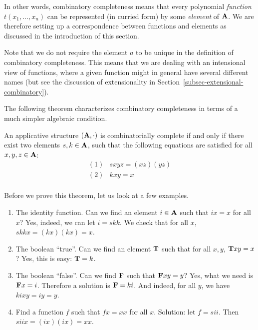 \documentclass{article}
\begin{document}
In other words, combinatory completeness means that every polynomial
{\em function} $t(x_1,\ldots,x_n)$ can be represented (in curried
form) by some {\em element} of ${\bf A}$. We are therefore setting up a
correspondence between functions and elements as discussed in the
introduction of this section.

Note that we do not require the element $a$ to be unique in the
definition of combinatory completeness. This means that we are dealing
with an intensional view of functions, where a given function might in
general have several different names (but see the discussion of
extensionality in Section~\ref{subsec-extensional-combinatory}).

The following theorem characterizes combinatory completeness in terms
of a much simpler algebraic condition.

\begin{theorem}\label{thm-combinatory-completeness}
  An applicative structure $({\bf A},\cdot)$ is combinatorially complete if
  and only if there exist two elements $s,k\in {\bf A}$, such that the
  following equations are satisfied for all $x,y,z\in{\bf A}$:
  \[ \begin{array}{ll}
    (1) & sxyz = (xz)(yz) \\
    (2) & kxy = x \\
  \end{array}
  \]
\end{theorem}

\begin{example}\label{exa-combinatory-completeness}
  Before we prove this theorem, let us look at a few examples.
  \begin{enumerate}\alphalabels
  \item The identity function. Can we find an element $i\in{\bf A}$ such
    that $ix=x$ for all $x$? Yes, indeed, we can let $i=skk$. We check
    that for all $x$, $skkx = (kx)(kx) = x$.
  \item The boolean ``true''. Can we find an element ${\bf T}$ such
    that for all $x,y$, ${\bf T} xy = x$? Yes, this is easy: ${\bf T} = k$.
  \item The boolean ``false''. Can we find ${\bf F}$ such that
    ${\bf F} xy = y$?  Yes, what we need is ${\bf F} x = i$. Therefore
    a solution is ${\bf F} = ki$.  And indeed, for all $y$, we have
    $kixy = iy = y$.
  \item Find a function $f$ such that $fx = xx$ for all $x$. Solution:
    let $f=sii$. Then $siix = (ix)(ix) = xx$. 
  \end{enumerate}
\end{example}
\end{document}
